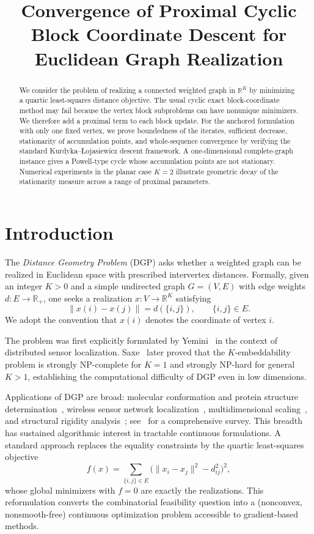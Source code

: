 \documentclass[11pt]{article}
\title{Convergence of Proximal Cyclic Block Coordinate Descent for Euclidean Graph Realization}
\date{}
\begin{document}
\maketitle

\begin{abstract}
We consider the problem of realizing a connected weighted graph in \(\mathbb R^K\) by minimizing a quartic least-squares distance objective.  The usual cyclic exact block-coordinate method may fail because the vertex block subproblems can have nonunique minimizers.  We therefore add a proximal term to each block update.  For the anchored formulation with only one fixed vertex, we prove boundedness of the iterates, sufficient decrease, stationarity of accumulation points, and whole-sequence convergence by verifying the standard Kurdyka--\L{}ojasiewicz descent framework.  A one-dimensional complete-graph instance gives a Powell-type cycle whose accumulation points are not stationary.  Numerical experiments in the planar case \(K=2\) illustrate geometric decay of the stationarity measure across a range of proximal parameters.
\end{abstract}

\section{Introduction}

The \emph{Distance Geometry Problem} (DGP) asks whether a weighted graph can be realized in Euclidean space with prescribed intervertex distances.  Formally, given an integer $K>0$ and a simple undirected graph $G=(V,E)$ with edge weights $d:E\to\mathbb R_+$, one seeks a realization $x:V\to\mathbb R^K$ satisfying
\[
    \|x(i)-x(j)\|=d(\{i,j\}),\qquad \{i,j\}\in E.
\]
We adopt the convention that $x(i)$ denotes the coordinate of vertex $i$.  

The problem was first explicitly formulated by Yemini~\cite{yemini1978} in the context of distributed sensor localization.  Saxe~\cite{saxe1979} later proved that the $K$-embeddability problem is strongly NP-complete for $K=1$ and strongly NP-hard for general $K>1$, establishing the computational difficulty of DGP even in low dimensions.

Applications of DGP are broad: molecular conformation and protein structure determination~\cite{crippen1988,more1999}, wireless sensor network localization~\cite{savvides2001}, multidimensional scaling~\cite{borgroenen2010}, and structural rigidity analysis~\cite{roth1981}; see~\cite{liberti2014} for a comprehensive survey.  This breadth has sustained algorithmic interest in tractable continuous formulations.  A standard approach replaces the equality constraints by the quartic least-squares objective
\[
    f(x)=\sum_{\{i,j\}\in E}\bigl(\|x_i-x_j\|^2-d_{ij}^2\bigr)^2,
\]
whose global minimizers with $f=0$ are exactly the realizations.  This reformulation converts the combinatorial feasibility question into a (nonconvex, nonsmooth-free) continuous optimization problem accessible to gradient-based methods.
\end{document}
